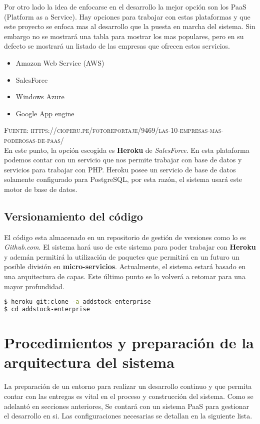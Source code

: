 Por otro lado la idea de enfocarse en el desarrollo la mejor opción son los PaaS (Platform as a Service). Hay opciones para trabajar con estas plataformas y que este proyecto se enfoca mas al desarrollo que la puesta en marcha del sistema. Sin embargo no se mostrará una tabla para mostrar los mas populares, pero en su defecto se mostrará un listado de las empresas que ofrecen estos servicios.

\begin{itemize}
\item Amazon Web Service (AWS)
\item SalesForce
\item Windows Azure
\item Google App engine
\end{itemize}
\textsc{Fuente: https://cioperu.pe/fotoreportaje/9469/las-10-empresas-mas-poderosas-de-paas/}\\

En este punto, la opción escogida es \textbf{Heroku} de \textit{SalesForce}. En esta plataforma podemos contar con un servicio que nos permite trabajar con base de datos y servicios para trabajar con PHP. Heroku posee un servicio de base de datos solamente configurado para PostgreSQL, por esta razón, el sistema usará este motor de base de datos.

\subsection{Versionamiento del código}

El código esta almacenado en un repositorio de gestión de versiones como lo es \textit{Github.com}. El sistema hará uso de este sistema para poder trabajar con \textbf{Heroku} y ademán permitirá la utilización de paquetes que permitirá en un futuro un posible división en \textbf{micro-servicios}. Actualmente, el sistema estará basado en una arquitectura de capas. Este último punto se lo volverá a retomar para una mayor profundidad.\\

\begin{lstlisting}[language=bash]
$ heroku git:clone -a addstock-enterprise
$ cd addstock-enterprise
\end{lstlisting}

\section{Procedimientos y preparación de la arquitectura del sistema}

La preparación de un entorno para realizar un desarrollo continuo y que permita contar con las entregas es vital en el proceso y construcción del sistema. Como se adelantó en secciones anteriores, Se contará con un sistema PaaS para gestionar el desarrollo en si. Las configuraciones necesarias se detallan en la siguiente lista.


